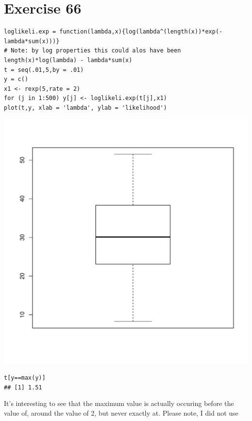 \documentclass{article}\usepackage[]{graphicx}\usepackage[]{color}
\makeatletter
\newenvironment{kframe}{%
 \def\at@end@of@kframe{}%
 \ifinner\ifhmode%
  \def\at@end@of@kframe{\end{minipage}}%
  \begin{minipage}{\columnwidth}%
 \fi\fi%
 \def\FrameCommand##1{\hskip\@totalleftmargin \hskip-\fboxsep
 \colorbox{shadecolor}{##1}\hskip-\fboxsep
     \hskip-\linewidth \hskip-\@totalleftmargin \hskip\columnwidth}%
 \MakeFramed {\advance\hsize-\width
   \@totalleftmargin\z@ \linewidth\hsize
   \@setminipage}}%
 {\par\unskip\endMakeFramed%
 \at@end@of@kframe}
\newenvironment{knitrout}{}{} %
\makeatother
\begin{document}
\section*{Exercise 66}
\begin{knitrout}
\color{fgcolor}\begin{kframe}
\begin{verbatim}
loglikeli.exp = function(lambda,x){log(lambda^(length(x))*exp(-lambda*sum(x)))}
# Note: by log properties this could alos have been length(x)*log(lambda) - lambda*sum(x)
t = seq(.01,5,by = .01)
y = c()
x1 <- rexp(5,rate = 2)
for (j in 1:500) y[j] <- loglikeli.exp(t[j],x1)
plot(t,y, xlab = 'lambda', ylab = 'likelihood')
\end{verbatim}
\end{kframe}
\includegraphics[width=0.33\linewidth]{figure/unnamed-chunk-3-1} 
\begin{kframe}\begin{verbatim}
t[y==max(y)]
## [1] 1.51
\end{verbatim}
\end{kframe}
\end{knitrout}
It's interesting to see that the maximum value is actually occuring before the value of, around the value of 2, but never exactly at. Please note, I did not use 
\end{document}
